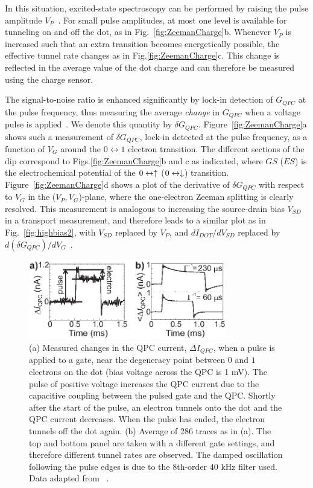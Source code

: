 \documentclass[rmp,twocolumn,aps]{revtex4}
\begin{document}
In this situation, excited-state spectroscopy can be performed by
raising the pulse amplitude
$V_P$~\cite{ElzermanAPL2004,JohnsonPRB2005}. For small pulse
amplitudes, at most one level is available for tunneling on and
off the dot, as in Fig.~\ref{fig:ZeemanCharge}b. Whenever $V_P$ is
increased such that an extra transition becomes energetically
possible, the effective tunnel rate changes as in
Fig.\ref{fig:ZeemanCharge}c. This change is reflected in the
average value of the dot charge and can therefore be measured
using the charge sensor.

The signal-to-noise ratio is enhanced significantly by lock-in
detection of $G_{QPC}$ at the pulse frequency, thus measuring the
average \textit{change} in $G_{QPC}$ when a voltage pulse is
applied~\cite{Sprinzak2002}. We denote this quantity by $\delta
G_{QPC}$. Figure~\ref{fig:ZeemanCharge}a shows such a measurement
of $\delta G_{QPC}$, lock-in detected at the pulse frequency, as a
function of $V_G$ around the $0\leftrightarrow1$ electron
transition. The different sections of the dip correspond to
Figs.\ref{fig:ZeemanCharge}b and c as indicated, where $GS$ ($ES$)
is the electrochemical potential of the $0\leftrightarrow\uparrow$
($0\leftrightarrow\downarrow$) transition. Figure~\ref{fig:ZeemanCharge}d
shows a plot of the derivative of $\delta G_{QPC}$ with respect to
$V_G$ in the ($V_P,V_G$)-plane, where the one-electron Zeeman
splitting is clearly resolved. This measurement is analogous to
increasing the source-drain bias $V_{SD}$ in a transport
measurement, and therefore leads to a similar plot as in
Fig.~\ref{fig:highbias2}, with $V_{SD}$ replaced by $V_P$, and
$dI_{DOT}/dV_{SD}$ replaced by $d (\delta
G_{QPC})/dV_G$~\cite{FujisawaPRL02,ElzermanAPL2004}.

\begin{figure}[htb]
\includegraphics[width=3.4in]{hanson_fig13.eps}
\caption{(a) Measured changes in the QPC current, $\Delta
I_{QPC}$, when a pulse is applied to a gate, near the degeneracy
point between $0$ and $1$ electrons on the dot (bias voltage
across the QPC is 1 mV). The pulse of positive voltage increases
the QPC current due to the capacitive coupling between the pulsed
gate and the QPC. Shortly after the start of the pulse, an
electron tunnels onto the dot and the QPC current decreases. When
the pulse has ended, the electron tunnels off the dot again. (b)
Average of 286 traces as in (a). The top and bottom panel are
taken with a different gate settings, and therefore different
tunnel rates are observed. The damped oscillation following the
pulse edges is due to the 8th-order 40 kHz filter used. Data
adapted from ~\textcite{VandersypenAPL2004}.}
\label{fig:RealTimeTunn}
\end{figure}
\end{document}
